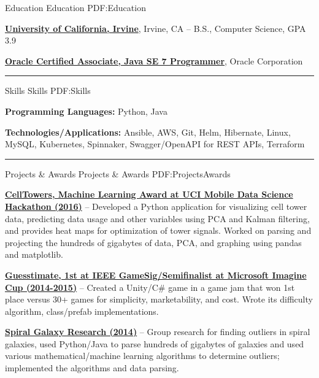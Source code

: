 \documentclass[letterpaper,MMMyyyy,nonstopmode]{simpleresumecv}
\begin{document}
\begin{Body}

	\Section
	{Education}
	{Education}
	{PDF:Education}

	\Entry
	\href{https://uci.edu/}
	{\textbf{University of California, Irvine}},
	Irvine, CA
	\hfill
	 --
	\Gap
	B.S., Computer Science, GPA 3.9\newline

	\Entry
	\href{http://education.oracle.com/pls/web_prod-plq-dad/db_pages.getpage?page_id=5001&get_params=p_exam_id:1Z0-803&p_org_id=&lang=}
	{\textbf{Oracle Certified Associate, Java SE 7 Programmer}},
	Oracle Corporation
	\hfill
	\newline
	\Gap

	\hrule


	\Section
	{Skills}
	{Skills}
	{PDF:Skills}

	\begin{flushleft}
		\textbf{Programming Languages:} Python, Java\newline

		\textbf{Technologies/Applications:} Ansible, AWS, Git, Helm, Hibernate, Linux, MySQL, Kubernetes, Spinnaker, Swagger/OpenAPI for REST APIs,  Terraform \newline
	\end{flushleft}

	\hrule


	\Section
	{Projects \& Awards}
	{Projects \& Awards}
	{PDF:ProjectsAwards}

	\Entry
	\href{https://github.com/trizzle21/Datathon2016}
	{\textbf{CellTowers, Machine Learning Award at UCI Mobile Data Science Hackathon (2016)}} -- Developed a Python application for visualizing cell tower data, predicting data usage and other variables using PCA and Kalman filtering, and provides heat maps for optimization of tower signals. Worked on parsing and projecting the hundreds of gigabytes of data, PCA, and graphing using pandas and matplotlib.\newline

	\Entry
	\href{https://github.com/brendonwai/PAS}
	{\textbf{Guesstimate, 1st at IEEE GameSig/Semifinalist at Microsoft Imagine Cup (2014-2015)}} -- Created a Unity/C\# game in a game jam that won 1st place versus 30+ games for simplicity, marketability, and cost. Wrote its difficulty algorithm, class/prefab implementations.\newline

	\Entry
	\href{https://github.com/SVT125/Research-CS199}
	{\textbf{Spiral Galaxy Research (2014)}} -- Group research for finding outliers in spiral galaxies, used Python/Java to parse hundreds of gigabytes of galaxies and used various mathematical/machine learning algorithms to determine outliers; implemented the algorithms and data parsing.\newline

\end{Body}
\end{document}
